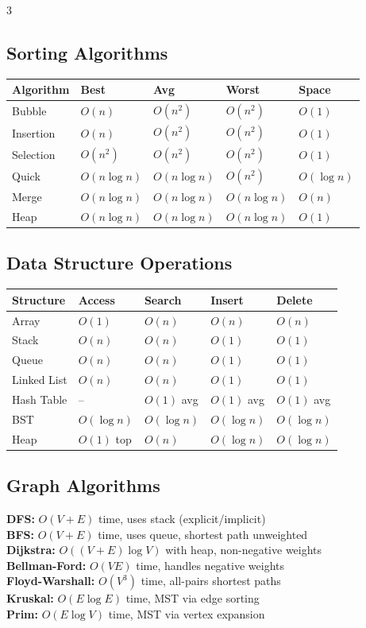 \documentclass[7pt,landscape]{extarticle}
\begin{document}
\begin{multicols*}{3}
\subsection*{Sorting Algorithms}
{\fontsize{5.5pt}{6.5pt}\selectfont
\begin{tabular}{@{}l@{\,}l@{\,}l@{\,}l@{\,}l@{}}
\toprule
\textbf{Algorithm} & \textbf{Best} & \textbf{Avg} & \textbf{Worst} & \textbf{Space} \\
\midrule
Bubble & $O(n)$ & $O(n^2)$ & $O(n^2)$ & $O(1)$ \\
Insertion & $O(n)$ & $O(n^2)$ & $O(n^2)$ & $O(1)$ \\
Selection & $O(n^2)$ & $O(n^2)$ & $O(n^2)$ & $O(1)$ \\
Quick & $O(n\log n)$ & $O(n\log n)$ & $O(n^2)$ & $O(\log n)$ \\
Merge & $O(n\log n)$ & $O(n\log n)$ & $O(n\log n)$ & $O(n)$ \\
Heap & $O(n\log n)$ & $O(n\log n)$ & $O(n\log n)$ & $O(1)$ \\
\bottomrule
\end{tabular}}

\subsection*{Data Structure Operations}
{\fontsize{5.5pt}{6.5pt}\selectfont
\begin{tabular}{@{}l@{\,}l@{\,}l@{\,}l@{\,}l@{}}
\toprule
\textbf{Structure} & \textbf{Access} & \textbf{Search} & \textbf{Insert} & \textbf{Delete} \\
\midrule
Array & $O(1)$ & $O(n)$ & $O(n)$ & $O(n)$ \\
Stack & $O(n)$ & $O(n)$ & $O(1)$ & $O(1)$ \\
Queue & $O(n)$ & $O(n)$ & $O(1)$ & $O(1)$ \\
Linked List & $O(n)$ & $O(n)$ & $O(1)$ & $O(1)$ \\
Hash Table & -- & $O(1)$ avg & $O(1)$ avg & $O(1)$ avg \\
BST & $O(\log n)$ & $O(\log n)$ & $O(\log n)$ & $O(\log n)$ \\
Heap & $O(1)$ top & $O(n)$ & $O(\log n)$ & $O(\log n)$ \\
\bottomrule
\end{tabular}}

\subsection*{Graph Algorithms}
\textbf{DFS:} $O(V+E)$ time, uses stack (explicit/implicit) \\
\textbf{BFS:} $O(V+E)$ time, uses queue, shortest path unweighted \\
\textbf{Dijkstra:} $O((V+E)\log V)$ with heap, non-negative weights \\
\textbf{Bellman-Ford:} $O(VE)$ time, handles negative weights \\
\textbf{Floyd-Warshall:} $O(V^3)$ time, all-pairs shortest paths \\
\textbf{Kruskal:} $O(E \log E)$ time, MST via edge sorting \\
\textbf{Prim:} $O(E \log V)$ time, MST via vertex expansion


\end{multicols*}
\end{document}
